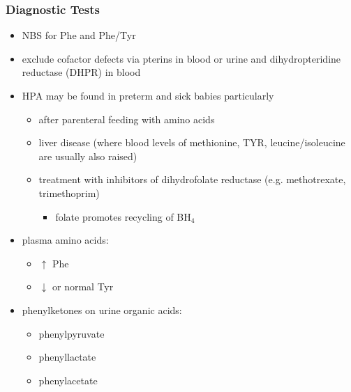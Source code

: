 \documentclass{scrartcl}
\begin{document}
\subsubsection{Diagnostic Tests}
\label{sec:org5a21478}
\begin{itemize}
\item NBS for Phe and Phe/Tyr
\item exclude cofactor defects via pterins in blood or urine and
dihydropteridine reductase (DHPR) in blood
\item HPA may be found in preterm and sick babies particularly
\begin{itemize}
\item after parenteral feeding with amino acids
\item liver disease (where blood levels of methionine, TYR,
leucine/isoleucine are usually also raised)
\item treatment with inhibitors of dihydrofolate reductase (e.g. methotrexate, trimethoprim)
\begin{itemize}
\item folate promotes recycling of BH\(_{\text{4}}\)
\end{itemize}
\end{itemize}
\item plasma amino acids:
\begin{itemize}
\item \(\uparrow\) Phe
\item \(\downarrow\) or normal Tyr
\end{itemize}
\item phenylketones on urine organic acids:
\begin{itemize}
\item phenylpyruvate
\item phenyllactate
\item phenylacetate
\end{itemize}
\end{itemize}
\end{document}
